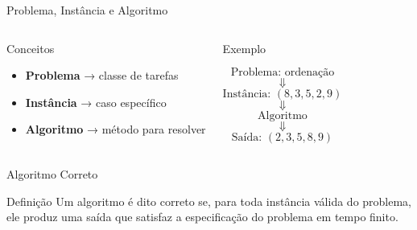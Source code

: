 \documentclass{beamer}
\newcommand{\og}[1]{\textcolor{rsOrange}{#1}}
\begin{document}
\begin{frame}{Problema, Instância e Algoritmo}

\begin{columns}


\begin{block}{Conceitos}
\begin{itemize}
    \item \textbf{Problema} → classe de tarefas
    \item \textbf{Instância} → caso específico
    \item \textbf{Algoritmo} → método para resolver
\end{itemize}
\end{block}


\begin{exampleblock}{Exemplo}

\[
\text{Problema: ordenação}
\]
\[
\Downarrow
\]
\[
\text{Instância: } (8,3,5,2,9)
\]
\[
\Downarrow
\]
\[
\text{Algoritmo}
\]
\[
\Downarrow
\]
\[
\text{Saída: } (2,3,5,8,9)
\]

\end{exampleblock}

\end{columns}

\end{frame}
\begin{frame}{Algoritmo Correto}

\begin{block}{Definição}
Um algoritmo é dito \og{correto} se, para toda instância válida do problema, ele produz uma saída que satisfaz a especificação do problema em tempo finito.
\end{block}

\vspace{0.4cm}


\end{frame}
\end{document}
